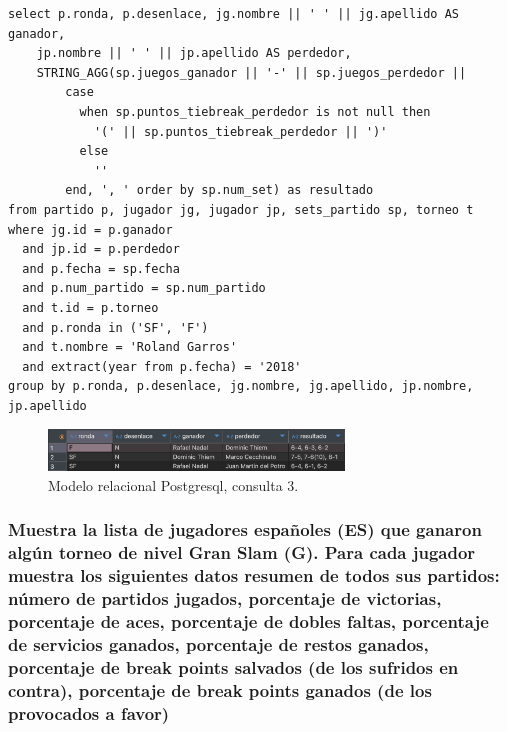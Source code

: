 \documentclass[11pt]{opticajnl}
\begin{document}
\begin{verbatim}
select p.ronda, p.desenlace, jg.nombre || ' ' || jg.apellido AS ganador, 
	jp.nombre || ' ' || jp.apellido AS perdedor, 
	STRING_AGG(sp.juegos_ganador || '-' || sp.juegos_perdedor ||
		case
		  when sp.puntos_tiebreak_perdedor is not null then 
		  	'(' || sp.puntos_tiebreak_perdedor || ')'
		  else 
		  	'' 
		end, ', ' order by sp.num_set) as resultado
from partido p, jugador jg, jugador jp, sets_partido sp, torneo t
where jg.id = p.ganador
  and jp.id = p.perdedor
  and p.fecha = sp.fecha
  and p.num_partido = sp.num_partido
  and t.id = p.torneo
  and p.ronda in ('SF', 'F')
  and t.nombre = 'Roland Garros'
  and extract(year from p.fecha) = '2018'
group by p.ronda, p.desenlace, jg.nombre, jg.apellido, jp.nombre, jp.apellido
\end{verbatim}

\begin{figure}[H]
\centering
\includegraphics[width=0.7\textwidth]{fotos/q3_rel.png}
\caption{Modelo relacional Postgresql, consulta 3.}
\label{fig:q3_rel}
\end{figure}

\subsubsection{Muestra la lista de jugadores españoles (ES) que ganaron algún torneo de nivel Gran Slam (G). Para cada jugador muestra los siguientes datos resumen de todos sus partidos: número de partidos jugados, porcentaje de victorias, porcentaje de aces, porcentaje de dobles faltas, porcentaje de servicios ganados, porcentaje de restos ganados, porcentaje de break points salvados (de los sufridos en contra), porcentaje de break points ganados (de los provocados a favor)}
\end{document}
